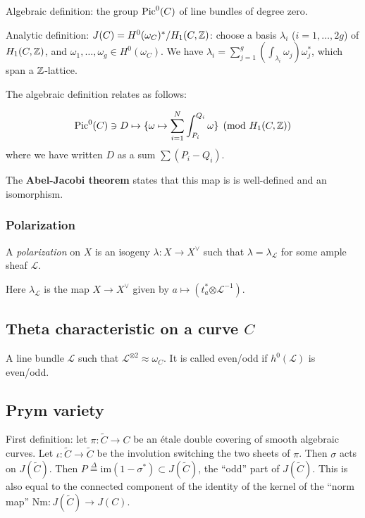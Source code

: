\documentclass[11pt, english]{article}
\begin{document}
Algebraic definition: the group $\operatorname{Pic}^0 (C)$ of line bundles of degree zero.

Analytic definition: $J(C) = H^0(\omega_C)^\ast / H_1(C,\mathbb{Z})$: choose a basis $\lambda_i$ ($i=1,\ldots,2g$) of $H_1(C,\mathbb{Z})$, and $\omega_1, \ldots,\omega_g \in H^0(\omega_C)$. We have $\lambda_i = \sum_{j=1}^g (\int_{\lambda_i} \omega_j)\omega_j^\ast$, which span a $\mathbb{Z}$-lattice.

	The algebraic definition relates as follows:

	$$
	\operatorname{Pic}^0(C) \ni D \mapsto \{ \omega \mapsto \sum_{i=1}^N \int_{P_i}^{Q_i} \omega \} \pmod{H_1(C,\mathbb{Z})}
	$$
	where we have written $D$ as a sum $\sum (P_i-Q_i)$.

	The \textbf{Abel-Jacobi theorem} states that this map is is well-defined and an isomorphism.


\subsubsection{Polarization} %
 \label{ssub:polarization}

 A \emph{polarization} on $X$ is an isogeny $\lambda: X \to X^\vee$ such that $\lambda=\lambda_{\mathcal L}$ for some ample sheaf $\mathcal L$.

 Here $\lambda_{\mathcal L}$ is the map $X \to X^\vee$ given by $a \mapsto (t_a^\ast \mathcal \otimes \mathcal L^{-1})$.
 

\subsection{Theta characteristic on a curve $C$}

	A line bundle $\mathcal L$ such that $\mathcal L^{\otimes 2} \approx \omega_C$. It is called even/odd if $h^0(\mathcal L)$ is even/odd.

\subsection{Prym variety}

	First definition: let $\pi: \widetilde C \to C$ be an étale double covering of smooth algebraic curves. Let $\iota: \widetilde C \to \widetilde C$ be the involution switching the two sheets of $\pi$. Then $\sigma$ acts on $J(\widetilde C)$. Then $P \stackrel \Delta = \mathrm{im}(1-\sigma^\ast) \subset J(\widetilde C)$, the ``odd'' part of $J(\widetilde C)$. This is also equal to the connected component of the identity of the kernel of the ``norm map'' $\mathrm {Nm}:J(\widetilde C) \to J(C)$.
\end{document}
